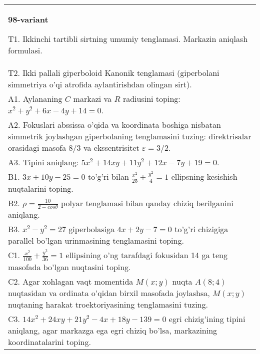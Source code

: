 \documentclass{article}
\begin{document}
\begin{tabular}{m{17cm}}
\textbf{98-variant}
\newline

T1. Ikkinchi tartibli sirtning umumiy tenglamasi. Markazin aniqlash formulasi.\\

T2. Ikki pallali giperboloid Kanonik tenglamasi (giperbolani simmetriya o'qi atrofida aylantirishdan olingan sirt).\\

A1. Aylananing $C$ markazi va $R$ radiusini toping: $x^2+y^2+6x-4y+14=0$.\\

A2. Fokuslari abssissa o'qida va koordinata boshiga nisbatan simmetrik joylashgan giperbolaning tenglamasini tuzing: direktrisalar orasidagi masofa $8/3$ va ekssentrisitet $\varepsilon=3/2$.\\

A3. Tipini aniqlang: $5x^{2}+14xy+11y^{2}+12x-7y+19=0$.\\

B1. $3x + 10y - 25 = 0$ to'g'ri bilan $\frac{x^{2}}{25} + \frac{y^{2}}{4} = 1$ ellipsning kesishish nuqtalarini toping.  \\

B2. $\rho = \frac{10}{2 - cos\theta}$ polyar tenglamasi bilan qanday chiziq berilganini aniqlang.  \\

B3. $x^{2} - y^{2} = 27$ giperbolasiga $4x + 2y - 7 = 0$ to'g'ri chizigiga parallel bo'lgan urinmasining tenglamasini toping.  \\

C1. $\frac{x^{2}}{100} + \frac{y^{2}}{36} = 1$ ellipsining o'ng tarafdagi fokusidan 14 ga teng masofada bo'lgan nuqtasini toping.  \\

C2. Agar xohlagan vaqt momentida $M(x;y)$ nuqta $A(8;4)$ nuqtasidan va ordinata o'qidan birxil masofada joylashsa, $M(x;y)$ nuqtaning harakat troektoriyasining tenglamasini tuzing.  \\

C3. $14x^{2} + 24xy + 21y^{2} - 4x + 18y - 139 = 0$ egri chizig'ining tipini aniqlang, agar markazga ega egri chiziq bo'lsa, markazining koordinatalarini toping.  \\

\end{tabular}
\vspace{1cm}
\end{document}
